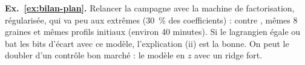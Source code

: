 \textbf{Ex.~\ref{ex:bilan-plan}.} Relancer la campagne avec la machine de factorisation, régularisée, qui va peu aux extrêmes (30~\% des coefficients) :  contre , mêmes 8 graines et mêmes profils initiaux (environ 40 minutes). Si le lagrangien égale ou bat les bits d'écart avec ce modèle, l'explication (ii) est la bonne. On peut le doubler d'un contrôle bon marché : le modèle en $z$ avec un ridge fort.

